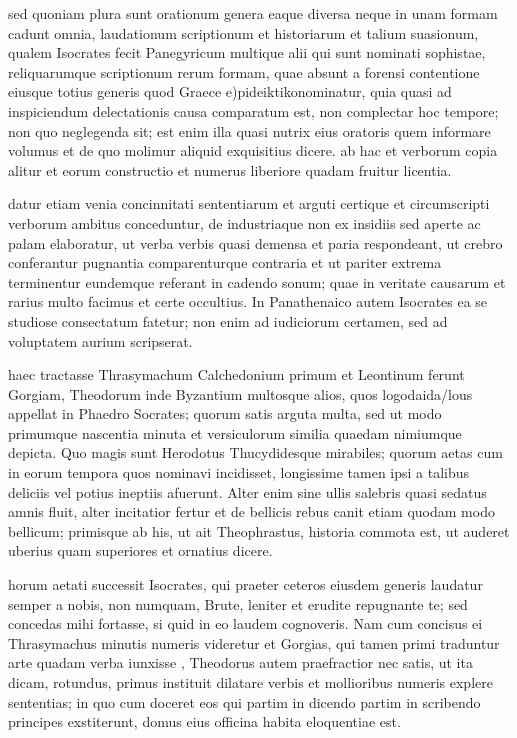  sed quoniam plura sunt orationum genera eaque diversa neque in unam formam cadunt omnia, laudationum scriptionum et historiarum et talium suasionum, qualem Isocrates fecit Panegyricum multique alii qui sunt nominati sophistae, reliquarumque scriptionum rerum formam, quae absunt a forensi contentione eiusque totius generis quod Graece e)pideiktiko\n nominatur, quia quasi ad inspiciendum delectationis causa comparatum est, non complectar hoc tempore; non quo neglegenda sit; est enim illa quasi nutrix eius oratoris quem informare volumus et de quo molimur aliquid exquisitius dicere. ab hac et verborum copia alitur et eorum constructio et numerus liberiore quadam fruitur licentia.

 datur etiam venia concinnitati sententiarum et arguti certique et circumscripti verborum ambitus conceduntur, de industriaque non ex insidiis sed aperte ac palam elaboratur, ut verba verbis quasi demensa et paria respondeant, ut crebro conferantur pugnantia comparenturque contraria et ut pariter extrema terminentur eundemque referant in cadendo sonum; quae in veritate causarum et rarius multo facimus et certe occultius. In Panathenaico autem Isocrates ea se studiose consectatum fatetur; non enim ad iudiciorum certamen, sed ad voluptatem aurium scripserat.

 haec tractasse Thrasymachum Calchedonium primum et Leontinum ferunt Gorgiam, Theodorum inde Byzantium multosque alios, quos logodaida/lous appellat in Phaedro Socrates; quorum satis arguta multa, sed ut modo primumque nascentia minuta et versiculorum similia quaedam nimiumque depicta. Quo magis sunt Herodotus Thucydidesque mirabiles; quorum aetas cum in eorum tempora quos nominavi incidisset, longissime tamen ipsi a talibus deliciis vel potius ineptiis afuerunt. Alter enim sine ullis salebris quasi sedatus amnis fluit, alter incitatior fertur et de bellicis rebus canit etiam quodam modo bellicum; primisque ab his, ut ait Theophrastus, historia commota est, ut auderet uberius quam superiores et ornatius dicere.

 horum aetati successit Isocrates, qui praeter ceteros eiusdem generis laudatur semper a nobis, non numquam, Brute, leniter et erudite repugnante te; sed concedas mihi fortasse, si quid in eo laudem cognoveris. Nam cum concisus ei Thrasymachus minutis numeris videretur et Gorgias, qui tamen primi traduntur arte quadam verba iunxisse , Theodorus autem praefractior nec satis, ut ita dicam, rotundus, primus instituit dilatare verbis et mollioribus numeris explere sententias; in quo cum doceret eos qui partim in dicendo partim in scribendo principes exstiterunt, domus eius officina habita eloquentiae est.


